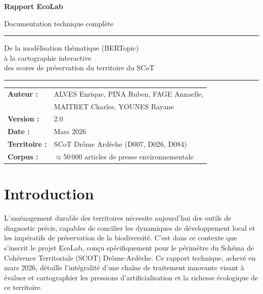 \documentclass[11pt,a4paper]{report}
\begin{document}
\begin{titlepage}
  \centering
  \vspace*{2cm}
  {\Huge\bfseries Rapport EcoLab\par}
  \vspace{0.5em}
  {\Large\color{NavyBlue} Documentation technique complète\par}
  \vspace{2cm}
  \rule{\textwidth}{1pt}
  \vspace{1em}
  {\large
  De la modélisation thématique (BERTopic) \\[0.3em]
  à la cartographie interactive \\[0.3em]
  des scores de préservation du territoire du SCoT \par
  }
  \vspace{1em}
  \rule{\textwidth}{1pt}
  \vspace{2cm}
  \begin{tabular}{ll}
    \textbf{Auteur :}   & ALVES Enrique, PINA Ruben, FAGE Annaelle,\\
    ~ & MAITRET Charles, YOUNES Rayane \\[0.3em]
    \textbf{Version :}  & 2.0 \\[0.3em]
    \textbf{Date :}     & Mars 2026 \\[0.3em]
    \textbf{Territoire :} & SCoT Drôme Ardèche (D007, D026, D084) \\[0.3em]
    \textbf{Corpus :}   & $\approx$50\,000 articles de presse environnementale \\[0.3em]
   
  \end{tabular}
  \vfill
\end{titlepage}

\tableofcontents
\clearpage


\chapter*{Introduction}

L'aménagement durable des territoires nécessite aujourd'hui des outils de diagnostic précis, capables de concilier les dynamiques de développement local et les impératifs de préservation de la biodiversité. C'est dans ce contexte que s'inscrit le projet EcoLab, conçu spécifiquement pour le périmètre du Schéma de Cohérence Territoriale (SCOT) Drôme-Ardèche. Ce rapport technique, achevé en mars 2026, détaille l'intégralité d'une chaîne de traitement innovante visant à évaluer et cartographier les pressions d'artificialisation et la richesse écologique de ce territoire.
\end{document}
